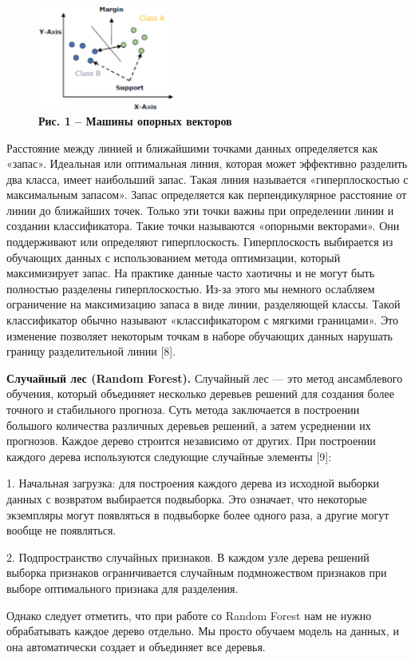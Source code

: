 \begin{figure}[H]
	\centering
	\includegraphics[width=0.4\textwidth]{assets/110}
	\caption*{\bfseries Рис. 1 -- Машины опорных векторов}
\end{figure}


\begin{multicols}{2}

Расстояние между линией и ближайшими точками данных определяется как
«запас». Идеальная или оптимальная линия, которая может эффективно
разделить два класса, имеет наибольший запас. Такая линия называется
«гиперплоскостью с максимальным запасом». Запас определяется как
перпендикулярное расстояние от линии до ближайших точек. Только эти
точки важны при определении линии и создании классификатора. Такие точки
называются «опорными векторами». Они поддерживают или определяют
гиперплоскость. Гиперплоскость выбирается из обучающих данных с
использованием метода оптимизации, который максимизирует запас. На
практике данные часто хаотичны и не могут быть полностью разделены
гиперплоскостью. Из-за этого мы немного ослабляем ограничение на
максимизацию запаса в виде линии, разделяющей классы. Такой
классификатор обычно называют «классификатором с мягкими границами». Это
изменение позволяет некоторым точкам в наборе обучающих данных нарушать
границу разделительной линии {[}8{]}.

{\bfseries Случайный лес (Random Forest).} Случайный лес --- это метод
ансамблевого обучения, который объединяет несколько деревьев решений для
создания более точного и стабильного прогноза. Суть метода заключается в
построении большого количества различных деревьев решений, а затем
усреднении их прогнозов. Каждое дерево строится независимо от других.
При построении каждого дерева используются следующие случайные элементы
{[}9{]}:

1. Начальная загрузка: для построения каждого дерева из исходной выборки
данных с возвратом выбирается подвыборка. Это означает, что некоторые
экземпляры могут появляться в подвыборке более одного раза, а другие
могут вообще не появляться.

2. Подпространство случайных признаков. В каждом узле дерева решений
выборка признаков ограничивается случайным подмножеством признаков при
выборе оптимального признака для разделения.

Однако следует отметить, что при работе со Random Forest нам не нужно
обрабатывать каждое дерево отдельно. Мы просто обучаем модель на данных,
и она автоматически создает и объединяет все деревья.
\end{multicols}

